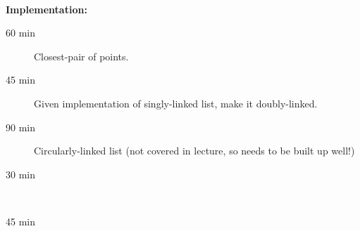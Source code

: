 \hfill\\
\textbf{Implementation:}\\
\begin{description}
	\item[60 min] Closest-pair of points.
	\item[45 min] Given implementation of singly-linked list, make it doubly-linked.
	\item[90 min] Circularly-linked list (not covered in lecture, so needs to be built up well!)
	\item[30 min] \hfill\\
	\item[45 min] \hfill\\
\end{description}
